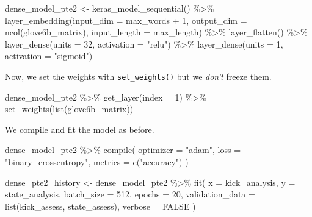 \documentclass[
]{krantz}
\makeatletter
\newenvironment{Shaded}{\begin{snugshade}}{\end{snugshade}}
\newcommand{\AttributeTok}[1]{\textcolor[rgb]{0.77,0.63,0.00}{#1}}
\newcommand{\ConstantTok}[1]{\textcolor[rgb]{0.00,0.00,0.00}{#1}}
\newcommand{\DecValTok}[1]{\textcolor[rgb]{0.00,0.00,0.81}{#1}}
\newcommand{\FunctionTok}[1]{\textcolor[rgb]{0.00,0.00,0.00}{#1}}
\newcommand{\NormalTok}[1]{#1}
\newcommand{\OtherTok}[1]{\textcolor[rgb]{0.56,0.35,0.01}{#1}}
\newcommand{\SpecialCharTok}[1]{\textcolor[rgb]{0.00,0.00,0.00}{#1}}
\newcommand{\StringTok}[1]{\textcolor[rgb]{0.31,0.60,0.02}{#1}}
\newenvironment{kframe}{%
\medskip{}
\setlength{\fboxsep}{.8em}
 \def\at@end@of@kframe{}%
 \ifinner\ifhmode%
  \def\at@end@of@kframe{\end{minipage}}%
  \begin{minipage}{\columnwidth}%
 \fi\fi%
 \def\FrameCommand##1{\hskip\@totalleftmargin \hskip-\fboxsep
 \colorbox{shadecolor}{##1}\hskip-\fboxsep
     \hskip-\linewidth \hskip-\@totalleftmargin \hskip\columnwidth}%
 \MakeFramed {\advance\hsize-\width
   \@totalleftmargin\z@ \linewidth\hsize
   \@setminipage}}%
 {\par\unskip\endMakeFramed%
 \at@end@of@kframe}
\renewenvironment{Shaded}{\begin{kframe}}{\end{kframe}}
\makeatother
\begin{document}
\begin{Shaded}
\begin{Highlighting}[]
\NormalTok{dense\_model\_pte2 }\OtherTok{\textless{}{-}} \FunctionTok{keras\_model\_sequential}\NormalTok{() }\SpecialCharTok{\%\textgreater{}\%}
  \FunctionTok{layer\_embedding}\NormalTok{(}\AttributeTok{input\_dim =}\NormalTok{ max\_words }\SpecialCharTok{+} \DecValTok{1}\NormalTok{,}
                  \AttributeTok{output\_dim =} \FunctionTok{ncol}\NormalTok{(glove6b\_matrix),}
                  \AttributeTok{input\_length =}\NormalTok{ max\_length) }\SpecialCharTok{\%\textgreater{}\%}
  \FunctionTok{layer\_flatten}\NormalTok{() }\SpecialCharTok{\%\textgreater{}\%}
  \FunctionTok{layer\_dense}\NormalTok{(}\AttributeTok{units =} \DecValTok{32}\NormalTok{, }\AttributeTok{activation =} \StringTok{"relu"}\NormalTok{) }\SpecialCharTok{\%\textgreater{}\%}
  \FunctionTok{layer\_dense}\NormalTok{(}\AttributeTok{units =} \DecValTok{1}\NormalTok{, }\AttributeTok{activation =} \StringTok{"sigmoid"}\NormalTok{)}
\end{Highlighting}
\end{Shaded}

Now, we set the weights with \texttt{set\_weights()} but we \emph{don't} freeze them.

\begin{Shaded}
\begin{Highlighting}[]
\NormalTok{dense\_model\_pte2 }\SpecialCharTok{\%\textgreater{}\%}
  \FunctionTok{get\_layer}\NormalTok{(}\AttributeTok{index =} \DecValTok{1}\NormalTok{) }\SpecialCharTok{\%\textgreater{}\%}
  \FunctionTok{set\_weights}\NormalTok{(}\FunctionTok{list}\NormalTok{(glove6b\_matrix))}
\end{Highlighting}
\end{Shaded}

We compile and fit the model as before.

\begin{Shaded}
\begin{Highlighting}[]
\NormalTok{dense\_model\_pte2 }\SpecialCharTok{\%\textgreater{}\%} \FunctionTok{compile}\NormalTok{(}
  \AttributeTok{optimizer =} \StringTok{"adam"}\NormalTok{,}
  \AttributeTok{loss =} \StringTok{"binary\_crossentropy"}\NormalTok{,}
  \AttributeTok{metrics =} \FunctionTok{c}\NormalTok{(}\StringTok{"accuracy"}\NormalTok{)}
\NormalTok{)}

\NormalTok{dense\_pte2\_history }\OtherTok{\textless{}{-}}\NormalTok{ dense\_model\_pte2 }\SpecialCharTok{\%\textgreater{}\%} \FunctionTok{fit}\NormalTok{(}
  \AttributeTok{x =}\NormalTok{ kick\_analysis,}
  \AttributeTok{y =}\NormalTok{ state\_analysis,}
  \AttributeTok{batch\_size =} \DecValTok{512}\NormalTok{,}
  \AttributeTok{epochs =} \DecValTok{20}\NormalTok{,}
  \AttributeTok{validation\_data =} \FunctionTok{list}\NormalTok{(kick\_assess, state\_assess),}
  \AttributeTok{verbose =} \ConstantTok{FALSE}
\NormalTok{)}
\end{Highlighting}
\end{Shaded}
\end{document}
